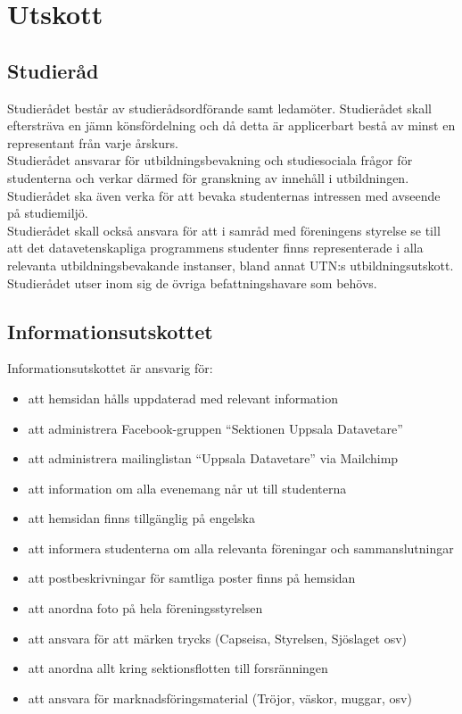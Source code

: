 \documentclass[a4paper]{article}
\begin{document}
\section{Utskott}
{\subsection{Studieråd}
  Studierådet består av studierådsordförande samt ledamöter. Studierådet skall eftersträva en jämn könsfördelning och då detta är applicerbart bestå av minst en representant från varje årskurs.\\
  Studierådet ansvarar för utbildningsbevakning och studiesociala frågor för studenterna och verkar därmed för granskning av innehåll i utbildningen. Studierådet ska även verka för att bevaka studenternas intressen med avseende på studiemiljö.\\
  Studierådet skall också ansvara för att i samråd med föreningens styrelse se till att det datavetenskapliga programmens studenter finns representerade i alla relevanta utbildningsbevakande instanser, bland annat UTN:s utbildningsutskott.\\
  Studierådet utser inom sig de övriga befattningshavare som behövs.
  
  \subsection{Informationsutskottet}
  Informationsutskottet är ansvarig för:
  \begin{itemize}
    \item att hemsidan hålls uppdaterad med relevant information
    \item att administrera Facebook-gruppen “Sektionen Uppsala Datavetare”
    \item att administrera mailinglistan “Uppsala Datavetare” via Mailchimp
    \item att information om alla evenemang når ut till studenterna
    \item att hemsidan finns tillgänglig på engelska
    \item att informera studenterna om alla relevanta föreningar och sammanslutningar
    \item att postbeskrivningar för samtliga poster finns på hemsidan
    \item att anordna foto på hela föreningsstyrelsen
    \item att ansvara för att märken trycks (Capseisa, Styrelsen, Sjöslaget osv)
    \item att anordna allt kring sektionsflotten till forsränningen
    \item att ansvara för marknadsföringsmaterial (Tröjor, väskor, muggar, osv)
  \end{itemize}
  
}
\end{document}
